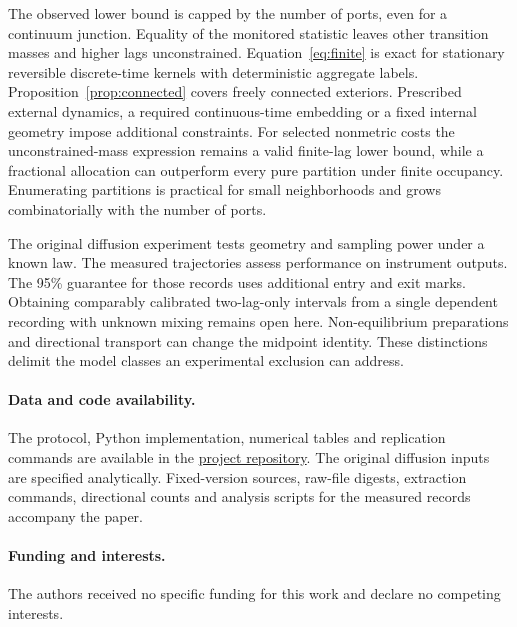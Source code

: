 \documentclass[11pt]{article}
\begin{document}
The observed lower bound is capped by the number of ports, even for a continuum junction. Equality of the monitored statistic leaves other transition masses and higher lags unconstrained. Equation~\eqref{eq:finite} is exact for stationary reversible discrete-time kernels with deterministic aggregate labels. Proposition~\ref{prop:connected} covers freely connected exteriors. Prescribed external dynamics, a required continuous-time embedding or a fixed internal geometry impose additional constraints. For selected nonmetric costs the unconstrained-mass expression remains a valid finite-lag lower bound, while a fractional allocation can outperform every pure partition under finite occupancy. Enumerating partitions is practical for small neighborhoods and grows combinatorially with the number of ports.

The original diffusion experiment tests geometry and sampling power under a known law. The measured trajectories assess performance on instrument outputs. The 95\% guarantee for those records uses additional entry and exit marks. Obtaining comparably calibrated two-lag-only intervals from a single dependent recording with unknown mixing remains open here. Non-equilibrium preparations and directional transport can change the midpoint identity. These distinctions delimit the model classes an experimental exclusion can address.

\paragraph{Data and code availability.}
The protocol, Python implementation, numerical tables and replication commands are available in the \href{https://github.com/fightforbelief/p2-coarse-junctions}{project repository}. The original diffusion inputs are specified analytically. Fixed-version sources, raw-file digests, extraction commands, directional counts and analysis scripts for the measured records accompany the paper.
\paragraph{Funding and interests.}
The authors received no specific funding for this work and declare no competing interests.
\end{document}
